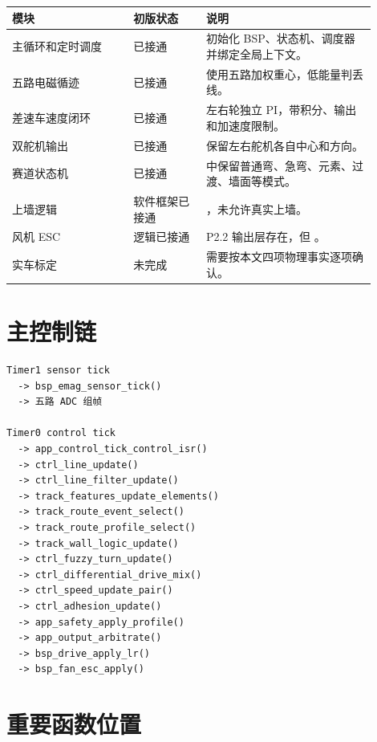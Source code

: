 \documentclass[UTF8,zihao=-4]{ctexart}
\begin{document}
\begin{longtable}{L{0.30\linewidth}L{0.18\linewidth}L{0.42\linewidth}}
\toprule
模块 & 初版状态 & 说明 \\
\midrule
主循环和定时调度 & 已接通 &  初始化 BSP、状态机、调度器并绑定全局上下文。 \\
五路电磁循迹 & 已接通 &  使用五路加权重心，低能量判丢线。 \\
差速车速度闭环 & 已接通 &  左右轮独立 PI，带积分、输出和加速度限制。 \\
双舵机输出 & 已接通 &  保留左右舵机各自中心和方向。 \\
赛道状态机 & 已接通 &  中保留普通弯、急弯、元素、过渡、墙面等模式。 \\
上墙逻辑 & 软件框架已接通 & ，未允许真实上墙。 \\
风机 ESC & 逻辑已接通 & P2.2 输出层存在，但 。 \\
实车标定 & 未完成 & 需要按本文四项物理事实逐项确认。 \\
\bottomrule
\end{longtable}

\section*{主控制链}

\begin{verbatim}
Timer1 sensor tick
  -> bsp_emag_sensor_tick()
  -> 五路 ADC 组帧

Timer0 control tick
  -> app_control_tick_control_isr()
  -> ctrl_line_update()
  -> ctrl_line_filter_update()
  -> track_features_update_elements()
  -> track_route_event_select()
  -> track_route_profile_select()
  -> track_wall_logic_update()
  -> ctrl_fuzzy_turn_update()
  -> ctrl_differential_drive_mix()
  -> ctrl_speed_update_pair()
  -> ctrl_adhesion_update()
  -> app_safety_apply_profile()
  -> app_output_arbitrate()
  -> bsp_drive_apply_lr()
  -> bsp_fan_esc_apply()
\end{verbatim}

\section*{重要函数位置}
\end{document}
